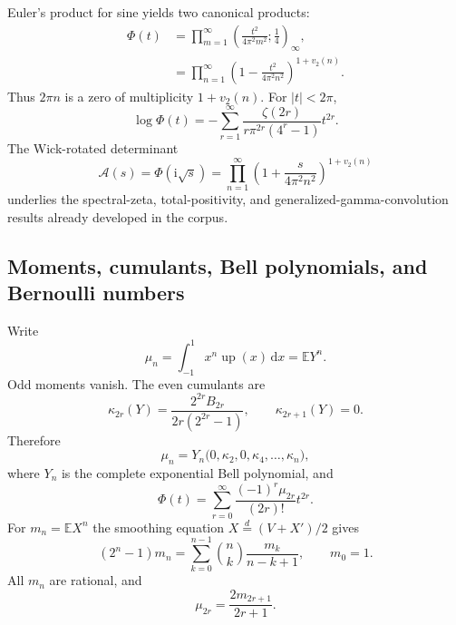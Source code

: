 \documentclass[11pt,oneside]{article}
\theoremstyle{definition}
\theoremstyle{remark}
\newcommand{\E}{\mathbb E}
\newcommand{\Up}{\operatorname{up}}
\newcommand{\ii}{\mathrm i}
\newcommand{\dd}{\,\mathrm d}
\begin{document}
Euler's product for sine yields two canonical products:
\begin{align}
 \Phi(t)
 &=\prod_{m=1}^\infty
   \left(\frac{t^2}{4\pi^2m^2};\frac14\right)_\infty,
 \label{eq:qpoch-Phi}\\
 &=\prod_{n=1}^\infty
   \left(1-\frac{t^2}{4\pi^2n^2}\right)^{1+v_2(n)}.
 \label{eq:zero-product}
\end{align}
Thus $2\pi n$ is a zero of multiplicity $1+v_2(n)$.  For $|t|<2\pi$,
\begin{equation}\label{eq:log-Phi-zeta}
 \log\Phi(t)
 =-\sum_{r=1}^\infty
 \frac{\zeta(2r)}{r\pi^{2r}(4^r-1)}t^{2r}.
\end{equation}
The Wick-rotated determinant
\begin{equation}\label{eq:wick-product}
 \mathcal A(s)=\Phi(\ii\sqrt{s})
 =\prod_{n=1}^\infty
 \left(1+\frac{s}{4\pi^2n^2}\right)^{1+v_2(n)}
\end{equation}
underlies the spectral-zeta, total-positivity, and generalized-gamma-convolution
results already developed in the corpus.

\subsection{Moments, cumulants, Bell polynomials, and Bernoulli numbers}

Write
\begin{equation}\label{eq:central-moments}
 \mu_n=\int_{-1}^1x^n\Up(x)\dd x=\E Y^n.
\end{equation}
Odd moments vanish.  The even cumulants are
\begin{equation}\label{eq:up-cumulants}
 \kappa_{2r}(Y)=\frac{2^{2r}B_{2r}}{2r(2^{2r}-1)},
 \qquad \kappa_{2r+1}(Y)=0.
\end{equation}
Therefore
\begin{equation}\label{eq:Bell-moments}
 \mu_n=Y_n\bigl(0,\kappa_2,0,\kappa_4,\ldots,\kappa_n\bigr),
\end{equation}
where $Y_n$ is the complete exponential Bell polynomial, and
\begin{equation}\label{eq:Phi-Taylor}
 \Phi(t)=\sum_{r=0}^\infty\frac{(-1)^r\mu_{2r}}{(2r)!}t^{2r}.
\end{equation}
For $m_n=\E X^n$ the smoothing equation
$X\overset d=(V+X')/2$ gives
\begin{equation}\label{eq:Fabius-moment-recurrence}
 (2^n-1)m_n=\sum_{k=0}^{n-1}\binom nk\frac{m_k}{n-k+1},
 \qquad m_0=1.
\end{equation}
All $m_n$ are rational, and
\begin{equation}\label{eq:central-one-sided-moment}
 \mu_{2r}=\frac{2m_{2r+1}}{2r+1}.
\end{equation}
\end{document}
